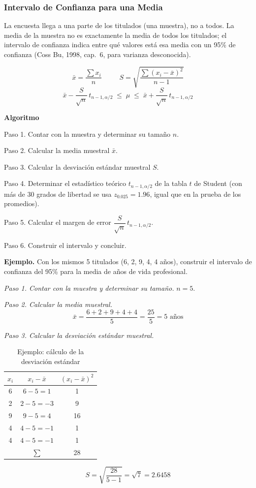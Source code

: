 \documentclass[12pt, a4paper]{article}
\newenvironment{mitabla}[2][H]{%
  \begin{table}[#1]
  \centering
  \caption{#2}
  \small
}{%
  \end{table}
}
\begin{document}
\subsubsection{Intervalo de Confianza para una Media}\label{sec:ic}

La encuesta llega a una parte de los titulados (una muestra), no a todos.
La media de la muestra no es exactamente la media de todos los titulados;
el intervalo de confianza indica entre qué valores está esa media con un
95\% de confianza (Coss Bu, 1998, cap.~6, para varianza desconocida).

\[
\boxed{\;\bar{x} = \frac{\sum x_i}{n}\;}
\qquad
\boxed{\;S = \sqrt{\frac{\sum (x_i - \bar{x})^2}{n-1}}\;}
\]
\[
\boxed{\;\bar{x} - \frac{S}{\sqrt{n}}\,t_{n-1,\alpha/2} \;\le\; \mu \;\le\; \bar{x} + \frac{S}{\sqrt{n}}\,t_{n-1,\alpha/2}\;}
\]

\textbf{Algoritmo}

Paso 1. Contar con la muestra y determinar su tamaño $n$.

Paso 2. Calcular la media muestral $\bar{x}$.

Paso 3. Calcular la desviación estándar muestral $S$.

Paso 4. Determinar el estadístico teórico $t_{n-1,\alpha/2}$ de la tabla
$t$ de Student (con más de 30 grados de libertad se usa $z_{0.025}=1.96$,
igual que en la prueba de los promedios).

Paso 5. Calcular el margen de error $\dfrac{S}{\sqrt{n}}\,t_{n-1,\alpha/2}$.

Paso 6. Construir el intervalo y concluir.

\textbf{Ejemplo.} Con los mismos 5 titulados (6, 2, 9, 4, 4 años),
construir el intervalo de confianza del 95\% para la media de años de
vida profesional.

\textit{Paso 1. Contar con la muestra y determinar su tamaño.} $n = 5$.

\textit{Paso 2. Calcular la media muestral.}
\[
\bar{x} = \frac{6 + 2 + 9 + 4 + 4}{5} = \frac{25}{5} = 5 \text{ años}
\]

\textit{Paso 3. Calcular la desviación estándar muestral.}

\begin{mitabla}{Ejemplo: cálculo de la desviación estándar}
\begin{tabular}{ccc}
\toprule
$x_i$ & $x_i - \bar{x}$ & $(x_i - \bar{x})^2$ \\
\midrule
6 & $6-5 = 1$ & 1 \\
2 & $2-5 = -3$ & 9 \\
9 & $9-5 = 4$ & 16 \\
4 & $4-5 = -1$ & 1 \\
4 & $4-5 = -1$ & 1 \\
\midrule
 & $\sum$ & 28 \\
\bottomrule
\end{tabular}
\end{mitabla}
\[
S = \sqrt{\frac{28}{5-1}} = \sqrt{7} = 2.6458
\]
\end{document}
